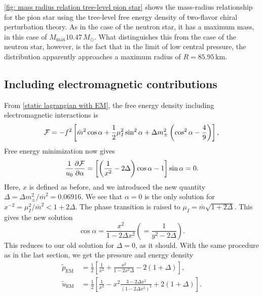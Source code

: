 \autoref{fig: mass radius relation tree-level pion star} shows the mass-radius relationship for the pion star using the tree-level free energy density of two-flavor chiral perturbation theory.
As in the case of the neutron star, it has a maximum mass, in this case of $M_\text{max} 10.47\, M_\odot$.
What distinguishes this from the case of the neutron star, however, is the fact that in the limit of low central pressure, the distribution apparently approaches a maximum radius of $R = 85.95 \, \text{km}$.




\FloatBarrier
\subsection{Including electromagnetic contributions}

From \autoref{static lagrangian with EM}, the free energy density including electromagnetic interactions is
%
\begin{equation}
    \mathcal{F} =
    - f^2 \left[
        \bar m^2 \cos \alpha 
        + \frac{1}{2} \mu_I^2 \sin^2 \alpha
        + \Delta m_\pm^2 \left(\cos^2 \alpha - \frac{4}{9}\right)
    \right],
\end{equation}
%
Free energy minimization now gives
%
\begin{equation}
    \frac{1}{u_0}\pdv{\mathcal{F}}{\alpha}
    = 
    \left[ \left( \frac{1}{x^2} - 2 \Delta \right) \cos \alpha - 1\right] \sin \alpha = 0.
\end{equation}
%
Here, $x$ is defined as before, and we introduced the new quantity $\Delta = \Delta m_{\pm}^2 / \bar m^2= 0.06916 $.
We see that $\alpha = 0$ is the only solution for $x^{-2} = \mu_I^2 / \bar m^2 < 1 + 2 \Delta$.
The phase transition is raised to $\mu_I = \bar m \sqrt{1 + 2 \Delta}$.
This gives the new solution
%
\begin{equation}
    \cos \alpha = \frac{x^2}{1 - 2 \Delta x^2}
    \left(= \frac{1}{y^2 - 2 \Delta}\right).
\end{equation}
%
This reduces to our old solution for $\Delta = 0$, as it should.
With the same procedure as in the last section, we get the pressure and energy density
%
\begin{align}
    \tilde p_\text{EM} \
    & = \frac{1}{2} 
    \left[
        \frac{1}{x^2} 
        + \frac{x^2}{1 - 2x^2 \Delta} 
        - 2(1 + \Delta)
    \right], \\
    \tilde u_\text{EM}
    &= \frac{1}{2} 
    \left[
        \frac{1}{x^2} 
        - x^2 \frac{3 - 2 \Delta x^2}{(1 - 2 \Delta x^2)^2}
        + 2(1 + \Delta)
    \right].
\end{align}
%

